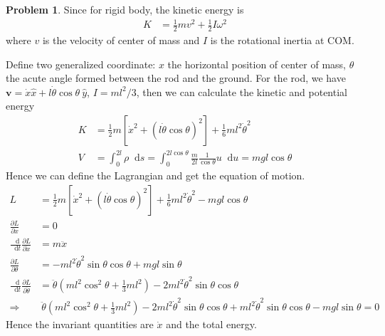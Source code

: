 \documentclass[twoside,11pt]{article}
\newcommand{\lms}{\fontfamily{lmss}\selectfont} %
\renewcommand*\d{\mathop{}\!\mathrm{d}}
\theoremstyle{definition}
\newtheorem{problem}{\lms Problem}
\theoremstyle{remark}
\begin{document}
\begin{problem}
Since for rigid body, the kinetic energy is
\begin{align*}
    K &= \frac{1}{2}mv^2 + \frac{1}{2}I\omega^2
\end{align*}
where $v$ is the velocity of center of mass and $I$ is the rotational inertia at COM.

Define two generalized coordinate: $x$ the horizontal position of center of mass, 
$\theta$ the acute angle formed between the rod and the ground.
For the rod, we have $\mathbf{v}=\dot{x}\hat{x} + l\dot{\theta}\cos\theta~\hat{y}$,
$I = ml^2/3$,
then we can calculate the kinetic and potential energy
\begin{align*}
    K &= \frac{1}{2}m[\dot{x}^2 + (l\dot{\theta}\cos\theta)^2] + \frac{1}{6}ml^2\dot{\theta}^2\\
    V &= \int_0^{2l}\rho\d s = \int_0^{2l\cos\theta}\frac{m}{2l}\frac{1}{\cos\theta} u\d u = mgl\cos\theta
\end{align*}
Hence we can define the Lagrangian and get the equation of motion.
\begin{align*}
    L &= \frac{1}{2}m[\dot{x}^2 + (l\dot{\theta}\cos\theta)^2]
    + \frac{1}{6}ml^2\dot{\theta}^2 - mgl\cos\theta\\
    \frac{\partial L}{\partial x} &= 0\\
    \frac{\d}{\d t}\frac{\partial L}{\partial\dot{x}} &= m\ddot{x}\\
    \frac{\partial L}{\partial \theta} &= 
    -ml^2\dot{\theta}^2\sin\theta\cos\theta
    + mgl\sin\theta\\
    \frac{\d}{\d t}\frac{\partial L}{\partial\dot{\theta}} &= 
    \ddot{\theta}\left(
        ml^2\cos^2\theta + \frac{1}{3}ml^2
    \right)
    - 2ml^2\dot{\theta}^2\sin\theta\cos\theta\\
    \Rightarrow
    &~\ddot{\theta}\left(
        ml^2\cos^2\theta + \frac{1}{3}ml^2
    \right)
    - 2ml^2\dot{\theta}^2\sin\theta\cos\theta
    +ml^2\dot{\theta}^2\sin\theta\cos\theta
    - mgl\sin\theta = 0
\end{align*}
Hence the invariant quantities are $\dot{x}$ and the total energy.

\end{problem}



\end{document}

